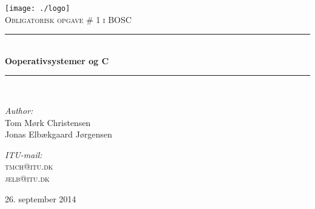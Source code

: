 \begin{titlepage}
\begin{center}


\texttt{[image: ./logo]}\\[1cm]

\textsc{\Large Obligatorisk opgave \# 1 i BOSC}\\[0.5cm]

\rule{\linewidth}{0.5mm} \\[0.3cm]
{ \LARGE \bfseries Ooperativsystemer og C\\[0.3cm]}
\rule{\linewidth}{0.5mm} \\[1.5cm]

\begin{minipage}{0.5\textwidth}
\begin{flushleft} \large
\emph{Author:}\\
Tom Mørk Christensen\\
Jonas Elbækgaard Jørgensen
\end{flushleft}
\end{minipage}
\begin{minipage}{0.3\textwidth}
\begin{flushright} \large
\emph{ITU-mail:} \\
\textsc{tmch@itu.dk} \\
\textsc{jelb@itu.dk}
\end{flushright}
\end{minipage}

\vfill

\large 26. september 2014

\end{center}
\end{titlepage}